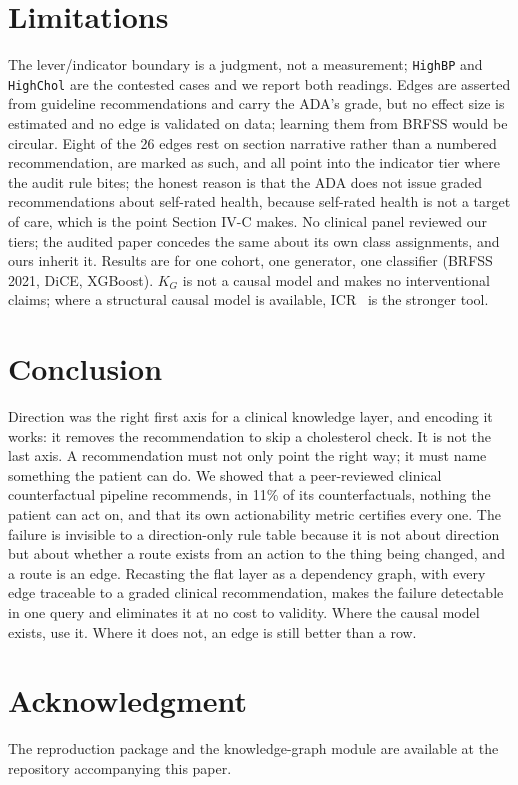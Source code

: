 \documentclass[conference]{IEEEtran}
\begin{document}
\section{Limitations}
The lever/indicator boundary is a judgment, not a measurement; \texttt{HighBP} and \texttt{HighChol} are the contested cases and we report both readings. Edges are asserted from guideline recommendations and carry the ADA's grade, but no effect size is estimated and no edge is validated on data; learning them from BRFSS would be circular. Eight of the 26 edges rest on section narrative rather than a numbered recommendation, are marked as such, and all point into the indicator tier where the audit rule bites; the honest reason is that the ADA does not issue graded recommendations about self-rated health, because self-rated health is not a target of care, which is the point Section IV-C makes. No clinical panel reviewed our tiers; the audited paper concedes the same about its own class assignments, and ours inherit it. Results are for one cohort, one generator, one classifier (BRFSS 2021, DiCE, XGBoost). $K_G$ is not a causal model and makes no interventional claims; where a structural causal model is available, ICR~\cite{konig2023} is the stronger tool.

\section{Conclusion}
Direction was the right first axis for a clinical knowledge layer, and encoding it works: it removes the recommendation to skip a cholesterol check. It is not the last axis. A recommendation must not only point the right way; it must name something the patient can do. We showed that a peer-reviewed clinical counterfactual pipeline recommends, in 11\% of its counterfactuals, nothing the patient can act on, and that its own actionability metric certifies every one. The failure is invisible to a direction-only rule table because it is not about direction but about whether a route exists from an action to the thing being changed, and a route is an edge. Recasting the flat layer as a dependency graph, with every edge traceable to a graded clinical recommendation, makes the failure detectable in one query and eliminates it at no cost to validity. Where the causal model exists, use it. Where it does not, an edge is still better than a row.

\section*{Acknowledgment}
The reproduction package and the knowledge-graph module are available at the repository accompanying this paper.
\end{document}
